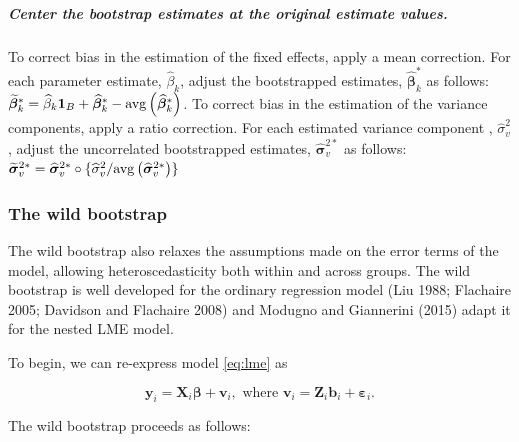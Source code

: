 \hypertarget{center-the-bootstrap-estimates-at-the-original-estimate-values.}{%
\subparagraph{Center the bootstrap estimates at the original estimate values.}\label{center-the-bootstrap-estimates-at-the-original-estimate-values.}}

To correct bias in the estimation of the fixed effects, apply a mean correction. For each parameter estimate, \(\widehat{\beta}_k\), adjust the bootstrapped estimates, \(\widehat{\boldsymbol{\beta}}_k^*\) as follows: \(\widetilde{\boldsymbol{\beta}}_k^{*} = \widehat{\beta}_k \boldsymbol{1}_{B} + \widehat{\boldsymbol{\beta}}_k^* -{\rm avg} \left( \widehat{ \boldsymbol{\beta} }_k^* \right)\).
To correct bias in the estimation of the variance components, apply a ratio correction. For each estimated variance component , \(\widehat{\sigma}^2_v\), adjust the uncorrelated bootstrapped estimates, \(\widehat{\boldsymbol{\sigma}}_v^{2*}\) as follows: \(\widetilde{\boldsymbol{\sigma}}_{v}^{2*} = \widehat{\boldsymbol{\sigma}}_v^{2*} \circ \lbrace \widehat{\sigma}^2_v / {\rm avg} \left( \widehat{\boldsymbol{\sigma}}_v^{2*} \right) \rbrace\)

\hypertarget{the-wild-bootstrap}{%
\subsubsection{The wild bootstrap}\label{the-wild-bootstrap}}

The wild bootstrap also relaxes the assumptions made on the error terms of the model, allowing heteroscedasticity both within and across groups. The wild bootstrap is well developed for the ordinary regression model (Liu 1988; Flachaire 2005; Davidson and Flachaire 2008) and Modugno and Giannerini (2015) adapt it for the nested LME model.

To begin, we can re-express model \eqref{eq:lme} as

\begin{equation}
\boldsymbol{y}_i = \boldsymbol{X}_i \boldsymbol{\beta} + \boldsymbol{v}_i, \text{ where } \boldsymbol{v}_i = \boldsymbol{Z}_i \boldsymbol{b}_i + \boldsymbol{\varepsilon}_i. 
\label{eq:wild}
\end{equation}

\noindent The wild bootstrap proceeds as follows:

